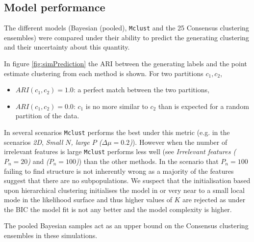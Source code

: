 \documentclass[]{article}
\begin{document}

\subsection{Model performance} \label{sec:simModelPerformance}
The different models (Bayesian (pooled), \texttt{Mclust} and the 25 Consensus clustering ensembles) were compared under their ability to predict the generating clustering and their uncertainty about this quantity.

In figure \ref{fig:simPrediction} the ARI between the generating labels and the point estimate clustering from each method is shown. For two partitions $c_1, c_2$, 
\begin{itemize}
	\item $ARI(c_1, c_2) = 1.0$: a perfect match between the two partitions,
	\item $ARI(c_1, c_2) = 0.0$: $c_1$ is no more similar to $c_2$ than is expected for a random partition of the data.
\end{itemize}
In several scenarios \texttt{Mclust} performs the best under this metric (e.g. in the scenarios \emph{2D}, \emph{Small $N$, large $P$ ($\Delta \mu = 0.2$)}). However when the number of irrelevant features is large \texttt{Mclust} performs less well (see \emph{Irrelevant features ($P_n = 20$)} and \emph{($P_n = 100$)}) than the other methods. In the scenario that $P_n = 100$ failing to find structure is not inherently wrong as a majority of the features suggest that there are no subpopulations. We suspect that the initialisation based upon hierarchical clustering initialises the model in or very near to a small local mode in the likelihood surface and thus higher values of $K$ are rejected as under the BIC the model fit is not any better and the model complexity is higher. 

The pooled Bayesian samples act as an upper bound on the Consensus clustering ensembles in these simulations.
\end{document}
